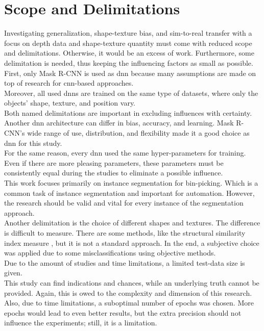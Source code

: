 	\section{Scope and Delimitations}
	\label{sec:scope-and-delimitations}
		Investigating generalization, shape-texture bias, and sim-to-real transfer with a focus on depth data and shape-texture quantity must come with reduced scope and delimitations. Otherwise, it would be an excess of work. Furthermore, some delimitation is needed, thus keeping the influencing factors as small as possible.\\
		First, only Mask R-CNN \cite{Kaiming2017} is used as \ac{dnn} because many assumptions are made on top of research for \ac{cnn}-based approaches.\\
		Moreover, all used \ac{dnn}s are trained on the same type of datasets, where only the objects' shape, texture, and position vary.\\
		Both named delimitations are important in excluding influences with certainty. Another \ac{dnn} architecture can differ in bias, accuracy, and learning. Mask R-CNN's wide range of use, distribution, and flexibility made it a good choice as \ac{dnn} for this study.\\
		For the same reason, every \ac{dnn} used the same hyper-parameters for training. Even if there are more pleasing parameters, these parameters must be consistently equal during the studies to eliminate a possible influence.\\
		This work focuses primarily on instance segmentation for bin-picking. Which is a common task of instance segmentation and important for automation\cite{Raj2023}\cite{Danielczuk2019}\cite{Xie2021}. However, the research should be valid and vital for every instance of the segmentation approach.\\
		Another delimitation is the choice of different shapes and textures. The difference is difficult to measure. There are some methods, like the structural similarity index measure \cite{Wang2004}, but it is not a standard approach. In the end, a subjective choice was applied due to some misclassifications using objective methods.
		\\
		Due to the amount of studies and time limitations, a limited test-data size is given.\\
		This study can find indications and chances, while an underlying truth cannot be provided. Again, this is owed to the complexity and dimension of this research.\\
		Also, due to time limitations, a suboptimal number of epochs was chosen. More epochs would lead to even better results, but the extra precision should not influence the experiments; still, it is a limitation.
